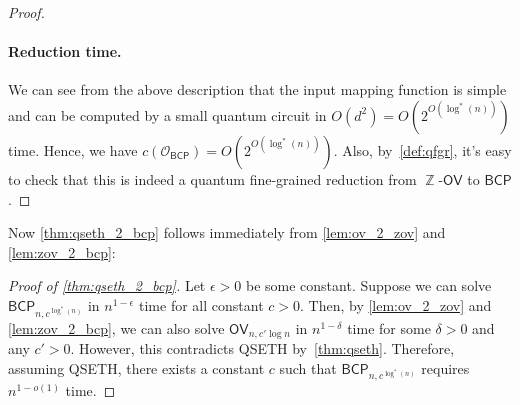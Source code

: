 \documentclass[10pt,a4paper]{article}
\newcommand{\eps}{\epsilon}
\renewcommand{\eps}{\epsilon}
\DeclareMathOperator*{\Z}{\mathbb{Z}}
\newcommand{\ora}{\mathcal{O}}
\newcommand{\OV}{\ensuremath{\mathsf{OV}}}
\newcommand{\BCP}{\ensuremath{\mathsf{BCP}}}
\newcommand{\ZOV}{\ensuremath{\Z\text{-}\mathsf{OV}}}
\begin{document}
\begin{proof}
\paragraph*{Reduction time.} We can see from the above description that the input mapping function is simple and can be computed by a small quantum circuit in $O(d^2)=O(2^{O(\log^* (n))})$ time. Hence, we have $c(\ora_{\BCP})=O(2^{O(\log^* (n))})$. Also, by~\cref{def:qfgr}, it's easy to check that this is indeed a quantum fine-grained reduction from $\ZOV$ to $\BCP$.
\end{proof}

Now \cref{thm:qseth_2_bcp} follows immediately from \cref{lem:ov_2_zov} and \cref{lem:zov_2_bcp}:
\begin{proof}[Proof of \cref{thm:qseth_2_bcp}]
Let $\eps > 0$ be some constant. Suppose we can solve $\BCP_{n,c^{\log^* (n)}}$ in $n^{1-\epsilon}$ time for all constant $c>0$. Then, by \cref{lem:ov_2_zov} and \cref{lem:zov_2_bcp}, we can also solve $\OV_{n,c'\log n}$ in $n^{1-\delta}$ time for some $\delta > 0$ and any $c'>0$. However, this contradicts QSETH by~\cref{thm:qseth}. Therefore, assuming QSETH, there exists a constant $c$ such that $\BCP_{n,c^{\log^*( n)}}$ requires $n^{1-o(1)}$ time.
\end{proof}
\end{document}
